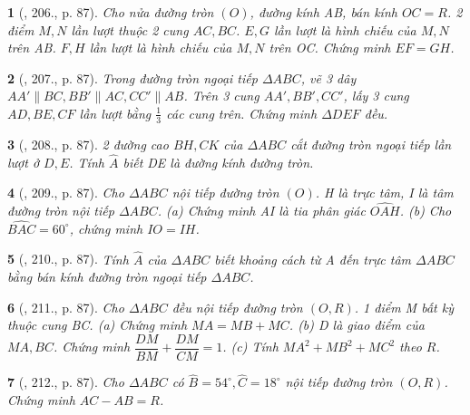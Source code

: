 \documentclass{article}
\newtheorem{baitoan}{}
\begin{document}
\begin{baitoan}[\cite{Binh_Toan_9_tap_2}, 206., p. 87]
	Cho nửa đường tròn $(O)$, đường kính AB, bán kính $OC = R$. 2 điểm $M,N$ lần lượt thuộc 2 cung $AC,BC$. $E,G$ lần lượt là hình chiếu của $M,N$ trên AB. $F,H$ lần lượt là hình chiếu của $M,N$ trên OC. Chứng minh $EF = GH$.
\end{baitoan}

\begin{baitoan}[\cite{Binh_Toan_9_tap_2}, 207., p. 87]
	Trong đường tròn ngoại tiếp $\Delta ABC$, vẽ 3 dây $AA'\parallel BC,BB'\parallel AC,CC'\parallel AB$. Trên 3 cung $AA',BB',CC'$, lấy 3 cung $AD,BE,CF$ lần lượt bằng $\frac{1}{3}$ các cung trên. Chứng minh $\Delta DEF$ đều.
\end{baitoan}

\begin{baitoan}[\cite{Binh_Toan_9_tap_2}, 208., p. 87]
	2 đường cao $BH,CK$ của $\Delta ABC$ cắt đường tròn ngoại tiếp lần lượt ở $D,E$. Tính $\widehat{A}$ biết DE là đường kính đường tròn.
\end{baitoan}

\begin{baitoan}[\cite{Binh_Toan_9_tap_2}, 209., p. 87]
	Cho $\Delta ABC$ nội tiếp đường tròn $(O)$. H là trực tâm, I là tâm đường tròn nội tiếp $\Delta ABC$. (a) Chứng minh AI là tia phân giác $\widehat{OAH}$. (b) Cho $\widehat{BAC} = 60^\circ$, chứng minh $IO = IH$.
\end{baitoan}

\begin{baitoan}[\cite{Binh_Toan_9_tap_2}, 210., p. 87]
	Tính $\widehat{A}$ của $\Delta ABC$ biết khoảng cách từ A đến trực tâm $\Delta ABC$ bằng bán kính đường tròn ngoại tiếp $\Delta ABC$.
\end{baitoan}

\begin{baitoan}[\cite{Binh_Toan_9_tap_2}, 211., p. 87]
	Cho $\Delta ABC$ đều nội tiếp đường tròn $(O,R)$. 1 điểm M bất kỳ thuộc cung BC. (a) Chứng minh $MA = MB + MC$. (b) D là giao điểm của $MA,BC$. Chứng minh $\dfrac{DM}{BM}  + \dfrac{DM}{CM} = 1$. (c) Tính $MA^2 + MB^2 + MC^2$ theo $R$.
\end{baitoan}

\begin{baitoan}[\cite{Binh_Toan_9_tap_2}, 212., p. 87]
	Cho $\Delta ABC$ có $\widehat{B} = 54^\circ,\widehat{C} = 18^\circ$ nội tiếp đường tròn $(O,R)$. Chứng minh $AC - AB = R$.
\end{baitoan}
\end{document}
